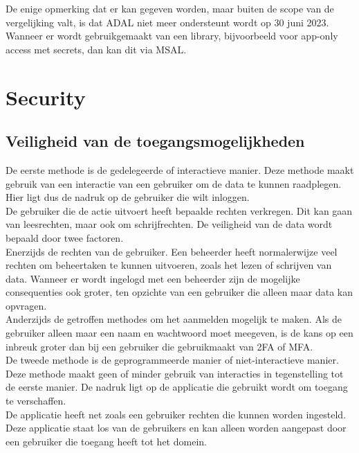 De enige opmerking dat er kan gegeven worden, maar buiten de scope van de vergelijking valt, is dat \ac{ADAL} niet meer ondersteunt wordt op 30 juni 2023. Wanneer er wordt gebruikgemaakt van een library, bijvoorbeeld voor app-only access met secrets, dan kan dit via \ac{MSAL}.



\section{Security}

\subsection{Veiligheid van de toegangsmogelijkheden}

De eerste methode is de gedelegeerde of interactieve manier. Deze methode maakt gebruik van een interactie van een gebruiker om de data te kunnen raadplegen. Hier ligt dus de nadruk op de gebruiker die wilt inloggen. \\

De gebruiker die de actie uitvoert heeft bepaalde rechten verkregen. Dit kan gaan van leesrechten, maar ook om schrijfrechten. De veiligheid van de data wordt bepaald door twee factoren. \\

Enerzijds de rechten van de gebruiker. Een beheerder heeft normalerwijze veel rechten om beheertaken te kunnen uitvoeren, zoals het lezen of schrijven van data. Wanneer er wordt ingelogd met een beheerder zijn de mogelijke consequenties ook groter, ten opzichte van een gebruiker die alleen maar data kan opvragen. \\ 

Anderzijds de getroffen methodes om het aanmelden mogelijk te maken. Als de gebruiker alleen maar een naam en wachtwoord moet meegeven, is de kans op een inbreuk groter dan bij een gebruiker die gebruikmaakt van \ac{2FA} of \Ac{MFA}. \\

De tweede methode is de geprogrammeerde manier of niet-interactieve manier. Deze methode maakt geen of minder gebruik van interacties in tegenstelling tot de eerste manier. De nadruk ligt op de applicatie die gebruikt wordt om toegang te verschaffen. \\

De applicatie heeft net zoals een gebruiker rechten die kunnen worden ingesteld. Deze applicatie staat los van de gebruikers en kan alleen worden aangepast door een gebruiker die toegang heeft tot het domein. \\

